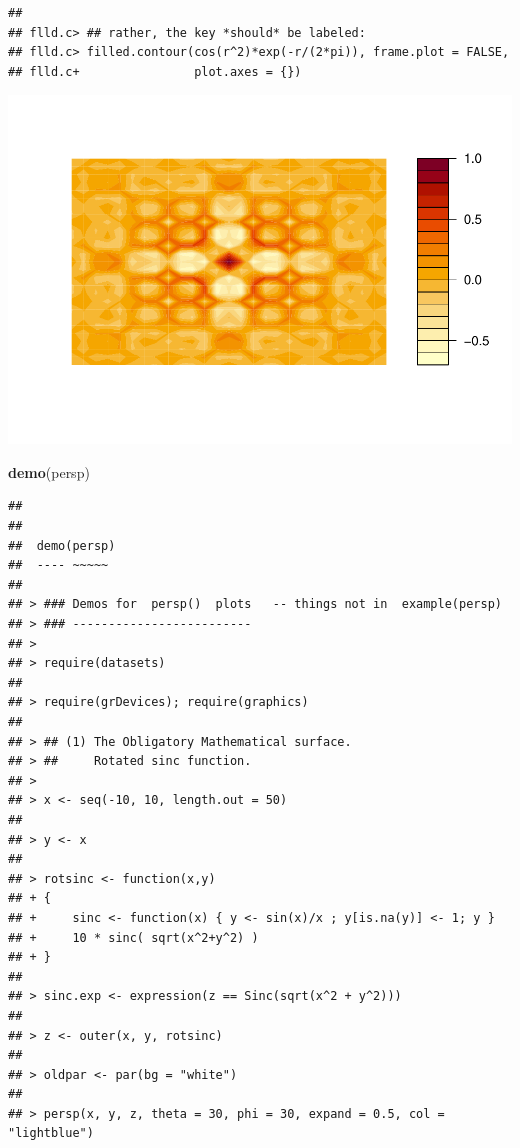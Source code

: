 \documentclass[
]{book}
\newenvironment{Shaded}{\begin{snugshade}}{\end{snugshade}}
\newcommand{\KeywordTok}[1]{\textcolor[rgb]{0.13,0.29,0.53}{\textbf{#1}}}
\newcommand{\NormalTok}[1]{#1}
\begin{document}
\begin{verbatim}
## 
## flld.c> ## rather, the key *should* be labeled:
## flld.c> filled.contour(cos(r^2)*exp(-r/(2*pi)), frame.plot = FALSE,
## flld.c+                plot.axes = {})
\end{verbatim}

\includegraphics{TudodoR_files/figure-latex/unnamed-chunk-145-8.pdf}

\begin{Shaded}
\begin{Highlighting}[]
\KeywordTok{demo}\NormalTok{(persp)}
\end{Highlighting}
\end{Shaded}

\begin{verbatim}
## 
## 
##  demo(persp)
##  ---- ~~~~~
## 
## > ### Demos for  persp()  plots   -- things not in  example(persp)
## > ### -------------------------
## > 
## > require(datasets)
## 
## > require(grDevices); require(graphics)
## 
## > ## (1) The Obligatory Mathematical surface.
## > ##     Rotated sinc function.
## > 
## > x <- seq(-10, 10, length.out = 50)
## 
## > y <- x
## 
## > rotsinc <- function(x,y)
## + {
## +     sinc <- function(x) { y <- sin(x)/x ; y[is.na(y)] <- 1; y }
## +     10 * sinc( sqrt(x^2+y^2) )
## + }
## 
## > sinc.exp <- expression(z == Sinc(sqrt(x^2 + y^2)))
## 
## > z <- outer(x, y, rotsinc)
## 
## > oldpar <- par(bg = "white")
## 
## > persp(x, y, z, theta = 30, phi = 30, expand = 0.5, col = "lightblue")
\end{verbatim}
\end{document}
